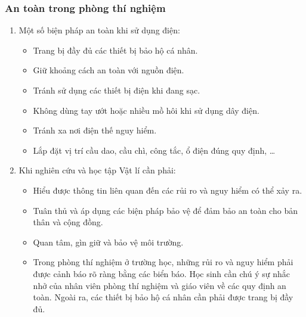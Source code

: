 \subsubsection{An toàn trong phòng thí nghiệm}
\begin{enumerate}[label=\alph*)]
	\item Một số biện pháp an toàn khi sử dụng điện:
	\begin{itemize}
		\item Trang bị đầy đủ các thiết bị bảo hộ cá nhân.
		\item Giữ khoảng cách an toàn với nguồn điện.
		\item Tránh sử dụng các thiết bị điện khi đang sạc.
		\item Không dùng tay ướt hoặc nhiều mồ hôi khi sử dụng dây điện.
		\item Tránh xa nơi điện thế nguy hiểm.
		\item Lắp đặt vị trí cầu dao, cầu chì, công tắc, ổ điện đúng quy định, \dots
	\end{itemize}
	\item  Khi nghiên cứu và học tập Vật lí cần phải:
	\begin{itemize}
		\item Hiểu được thông tin liên quan đến các rủi ro và nguy hiểm có thể xảy ra.
		\item Tuân thủ và áp dụng các biện pháp bảo vệ để đảm bảo an toàn cho bản thân và cộng đồng.
		\item Quan tâm, gìn giữ và bảo vệ môi trường.
		\item Trong phòng thí nghiệm ở trường học, những rủi ro và nguy hiểm phải được cảnh báo rõ ràng bằng các biển báo. Học sinh cần chú ý sự nhắc nhở của nhân viên phòng thí nghiệm và giáo viên về các quy định an toàn. Ngoài ra, các thiết bị bảo hộ cá nhân cần phải được trang bị đầy đủ.
	\end{itemize}
\end{enumerate}
